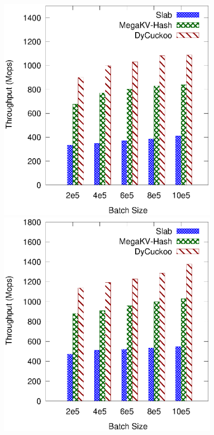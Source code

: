 \begin{figure}[htp]
\begin{minipage}{0.19\linewidth}
		\centerline{\dsreddit}
	\end{minipage}
	\begin{minipage}{0.19\linewidth}\centering
		\includegraphics[width=\linewidth]{pic/dynamic/batch/dynamic_tpch.eps}
		\centerline{\dstpch}
	\end{minipage}
	\begin{minipage}{0.19\linewidth}\centering
		\includegraphics[width=\linewidth]{pic/dynamic/batch/dynamic_ali.eps}

\end{minipage}
\end{figure}
